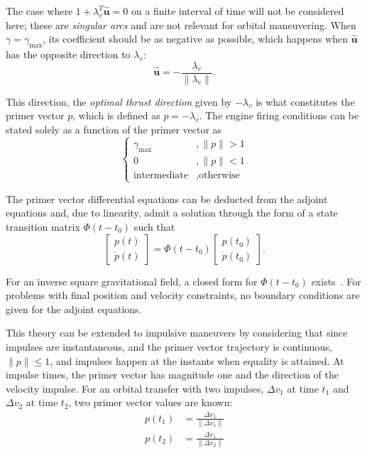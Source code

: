 The case where \(1 + \lambda_v^T \hat{\mathbf{u}} = 0\) on a finite interval of time will not be considered here; these are \textit{singular arcs} and are not relevant for orbital maneuvering. When \(\gamma = \gamma_{\max}\), its coefficient should be as negative as possible, which happens when \(\hat{\mathbf{u}}\) has the opposite direction to \(\lambda_v\):
\begin{equation}
    \hat{\mathbf{u}} = - \frac{\lambda_v}{\lVert \lambda_v \rVert}.
\end{equation}

This direction, the \textit{optimal thrust direction} given by \(-\lambda_v\) is what constitutes the primer vector \(p\), which is defined as \(p = -\lambda_v\). The engine firing conditions can be stated solely as a function of the primer vector as~\cite{Conway_2010}
\begin{equation}
    \begin{cases}
        \gamma_{\max}&, \lVert p \rVert > 1 \\
        0&, \lVert p \rVert < 1 \\
        \text{intermediate}&, \text{otherwise}
    \end{cases}
\end{equation}

The primer vector differential equations can be deducted from the adjoint equations and, due to linearity, admit a solution through the form of a state transition matrix \(\Phi(t - t_0)\) such that
\begin{equation}
    \begin{bmatrix}
        p(t) \\ \dot{p}(t)
    \end{bmatrix} = \Phi(t - t_0) \begin{bmatrix}
        p(t_0) \\ \dot{p}(t_0)
    \end{bmatrix}.
\end{equation}

For an inverse square gravitational field, a closed form for \(\Phi(t-t_0)\) exists~\cite{glandorf_transition_matrix}. For problems with final position and velocity constraints, no boundary conditions are given for the adjoint equations.

This theory can be extended to impulsive maneuvers by considering that since impulses are instantaneous, and the primer vector trajectory is continuous, \(\lVert p \rVert \leq 1\), and impulses happen at the instants when equality is attained. At impulse times, the primer vector has magnitude one and the direction of the velocity impulse. For an orbital transfer with two impulses, \(\Delta v_1\) at time \(t_1\) and \(\Delta v_2\) at time \(t_2\), two primer vector values are known:
\begin{align}
    p(t_1) &= \frac{\Delta v_1}{\lVert \Delta v_1 \rVert} \\
    p(t_2) &= \frac{\Delta v_1}{\lVert \Delta v_2 \rVert}
\end{align}

